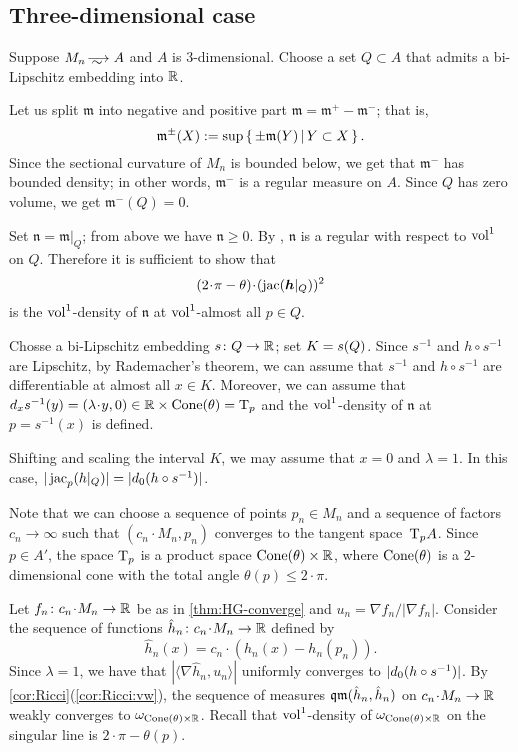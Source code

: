 \subsection{Three-dimensional case}


Suppose $M_n\smooths{}A$ and $A$ is 3-dimensional.
Choose a set $Q\subset A$ that admits a bi-Lipschitz embedding into $\mathbb{R}$. 

Let us split $\mathfrak m$ into negative and positive part $\mathfrak m=\mathfrak m^+-\mathfrak m^-$; that is,
\[\mathfrak m^\pm(X)\mathrel{{:}{=}}\sup\left\{\,\pm\mathfrak m(Y)\,\middle|\,Y\subset X\,\right\}.\]
Since the sectional curvature of $M_n$ is bounded below, we get that $\mathfrak m^-$ has bounded density; in other words, $\mathfrak m^-$ is a regular measure on $A$.
Since $Q$ has zero volume, we get $\mathfrak m^-(Q)=0$.

Set $\mathfrak n=\mathfrak m|_{Q}$; from above we have $\mathfrak n\ge 0$.
By \cite{petrunin-SC}, $\mathfrak n$ is a regular with respect to $\operatorname{vol}^1$ on $Q$.
Therefore it is sufficient to show that 
\[(2\cdot\pi-\theta)\cdot (\jac(\bm{h}|_Q))^2\]
is the $\operatorname{vol}^1$-density of $\mathfrak n$
at $\operatorname{vol}^1$-almost all $p\in Q$.

Chosse a bi-Lipschitz embedding $s\colon Q\to \mathbb{R}$;
set $K\zz=s(Q)$.
Since $s^{-1}$ and $h\circ s^{-1}$ are Lipschitz, 
by Rademacher's theorem, we can assume that $s^{-1}$ and $h\circ s^{-1}$ are differentiable at almost all $x\in K$.
Moreover, we can assume that $d_xs^{-1}(y)=(\lambda\cdot y,0)\in \RR\times \Cone(\theta)=\T_p$ and the $\operatorname{vol}^1$-density of $\mathfrak n$ at $p=s^{-1}(x)$ is defined.

Shifting and scaling the interval $K$, we may assume that $x=0$ and $\lambda=1$.
In this case, $|\mathop{\rm jac}_p(h|_Q)|=|d_0(h\circ s^{-1})|$.

Note that we can choose a sequence of points $p_n\in M_n$ and a sequence of factors $c_n\to \infty$ such that $(c_n\cdot M_n,p_n)$ converges to the tangent space~$\mathrm{T}_pA$.
Since $p\in A'$, the space $\mathrm{T}_p$ is a product space $\operatorname{Cone}(\theta)\times\mathbb{R}$, where $\operatorname{Cone}(\theta)$ is a 2-dimensional cone with the total angle $\theta(p)\le2\cdot\pi$.

Let $f_n\:c_n\cdot M_n\to \RR$ be as in \ref{thm:HG-converge} and $u_n=\nabla f_n/|\nabla f_n|$.
Consider the sequence of functions $\hat h_n\:c_n\cdot M_n\to \RR$ defined by 
\[\hat h_n(x)=c_n\cdot(h_n(x)-h_n(p_n)).\]
Since $\lambda=1$, we have that $|\langle\nabla \hat h_n,u_n\rangle|$ uniformly converges to $|d_0(h\zz\circ s^{-1})|$.
By \ref{cor:Ricci}(\ref{cor:Ricci:vw}), the sequence of measures $\operatorname{\mathfrak{qm}}(\hat h_n, \hat h_n)$ on $c_n\cdot M_n\to \RR$ weakly converges to $\omega_{\operatorname{Cone}(\theta)\times\mathbb{R}}$.
Recall that $\operatorname{vol}^1$-density of $\omega_{\operatorname{Cone}(\theta)\times\mathbb{R}}$ on the singular line is $2\cdot \pi-\theta(p)$.


